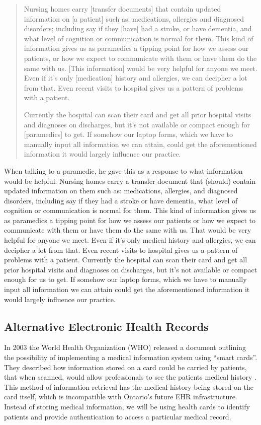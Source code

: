 \blockquote{Nursing homes carry [transfer documents] that contain updated information on [a patient] such as: medications, allergies and diagnosed disorders; including say if they [have] had a stroke, or have dementia, and what level of cognition or communication is normal for them. This kind of information gives us as paramedics a tipping point for how we assess our patients, or how we expect to communicate with them or have them do the same with us. [This information] would be very helpful for anyone we meet. Even if it's only [medication] history and allergies, we can decipher a lot from that. Even recent visits to hospital gives us a pattern of problems with a patient.

Currently the hospital can scan their card and get all prior hospital visits and diagnoses on discharges, but it's not available or compact enough for [paramedics] to get. If somehow our laptop forms, which we have to manually input all information we can attain, could get the aforementioned information it would largely influence our practice.
}

When talking to a paramedic, he gave this as a response to what information would be helpful:
Nursing homes carry a transfer document that (should) contain updated information on them such as: medications, allergies, and diagnosed disorders, including say if they had a stroke or have dementia, what level of cognition or communication is normal for them. This kind of information gives us as paramedics a tipping point for how we assess our patients or how we expect to communicate with them or have them do the same with us. That would be very helpful for anyone we meet. Even if it's only medical history and allergies, we can decipher a lot from that. Even recent visits to hospital gives us a pattern of problems with a patient. Currently the hospital can scan their card and get all prior hospital visits and diagnoses on discharges, but it's not available or compact enough for us to get. If somehow our laptop forms, which we have to manually input all information we can attain could get the aforementioned information it would largely influence our practice.

\fi




\subsection{Alternative Electronic Health Records}

In 2003 the World Health Organization (WHO) released a document outlining the possibility of implementing a medical information system using “smart cards”. They described how information stored on a card could be carried by patients, that when scanned, would allow professionals to see the patients medical history \cite{smartcard1}. This method of information retrieval has the medical history being stored on the card itself, which is incompatible with Ontario's future EHR infrastructure. Instead of storing medical information, we will be using health cards to identify patients and provide authentication to access a particular medical record.


